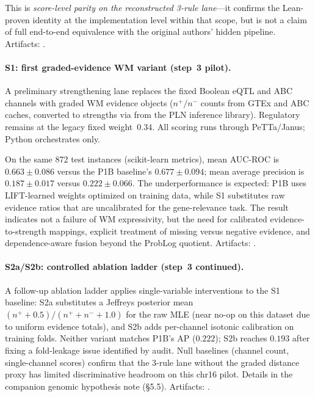 \documentclass[11pt,openany]{report}
\begin{document}
This is \emph{score-level parity on the reconstructed 3-rule lane}---it
confirms the Lean-proven identity at the implementation level within that
scope, but is not a claim of full end-to-end equivalence with the original
authors' hidden pipeline.
Artifacts: .

\paragraph{S1: first graded-evidence WM variant (step~3 pilot).}
A preliminary strengthening lane replaces the fixed Boolean eQTL and ABC
channels with graded WM evidence objects ($n^{+}/n^{-}$ counts from GTEx
and ABC caches, converted to strengths via  from
the PLN inference library).  Regulatory remains at the legacy fixed
weight~$0.34$.  All scoring runs through PeTTa/Janus; Python orchestrates
only.

On the same 872 test instances (scikit-learn metrics), mean AUC-ROC is
$0.663 \pm 0.086$ versus the P1B baseline's $0.677 \pm 0.094$; mean average
precision is $0.187 \pm 0.017$ versus $0.222 \pm 0.066$.  The
underperformance is expected: P1B uses LIFT-learned weights optimized on
training data, while S1 substitutes raw evidence ratios that are uncalibrated
for the gene-relevance task.  The result indicates not a failure of WM
expressivity, but the need for calibrated evidence-to-strength mappings,
explicit treatment of missing versus negative evidence, and
dependence-aware fusion beyond the ProbLog quotient.
Artifacts: .

\paragraph{S2a/S2b: controlled ablation ladder (step~3 continued).}
A follow-up ablation ladder applies single-variable interventions to
the S1 baseline: S2a substitutes a Jeffreys posterior mean
$(n^{+}+0.5)/(n^{+}+n^{-}+1.0)$ for the raw MLE (near no-op on this
dataset due to uniform evidence totals), and S2b adds per-channel
isotonic calibration on training folds.  Neither variant matches P1B's
AP ($0.222$); S2b reaches $0.193$ after fixing a fold-leakage issue
identified by audit.  Null baselines (channel count, single-channel
scores) confirm that the 3-rule lane without the graded distance proxy
has limited discriminative headroom on this chr16 pilot.  Details in
the companion genomic hypothesis note (\S5.5).
Artifacts: .
\end{document}
